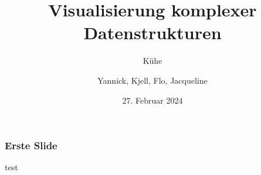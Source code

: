 \documentclass{beamer}
\title[]{Visualisierung komplexer Datenstrukturen}
\subtitle{Kühe}
\author[]{Yannick, Kjell, Flo, Jacqueline}
\date[27.02.2024]{27. Februar 2024}
\begin{document}
 
	\begin{frame}
		\maketitle
	\end{frame}        
	
	\addtocounter{framenumber}{-1}
	
	\begin{frame}
		\frametitle{Erste Slide}	
		test
	\end{frame}
\end{document}
